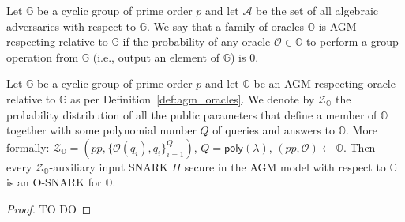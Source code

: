 \begin{definition}
\label{def:agm_oracles}
Let $\mathbb{G}$ be a cyclic group of prime order $p$ and let $\mathcal{A}$ be the set of all algebraic adversaries with 
respect to $\mathbb{G}$. We say that a family of oracles $\mathbb{O}$ is AGM respecting relative to $\mathbb{G}$ if 
the probability of any oracle $\mathcal{O} \in \mathbb{O}$ to perform a group operation from $\mathbb{G}$ 
(i.e., output an element of $\mathbb{G}$) is $0$. 
\end{definition}

\begin{theorem}
\label{the:when_osnarks} 
Let $\mathbb{G}$ be a cyclic group of prime order $p$ and let $\mathbb{O}$ be an AGM respecting oracle 
relative to $\mathbb{G}$ as per Definition~\ref{def:agm_oracles}. We denote by $\mathcal{Z}_{\mathbb{O}}$ the 
probability distribution of all the public parameters that define a member of $\mathbb{O}$ together with some 
polynomial number $Q$ of queries and answers to $\mathbb{O}$. More formally: 
$\mathcal{Z}_{\mathbb{O}} = (\mathit{pp}, \{\mathcal{O}(q_i), q_i\}_{i=1}^Q)$, $Q = \mathsf{poly}(\lambda)$, $(\mathit{pp}, \mathcal{O}) \leftarrow \mathbb{O}$. 
Then every $\mathcal{Z}_{\mathbb{O}}$-auxiliary input SNARK $\Pi$ secure in the AGM model with respect to $\mathbb{G}$ is an O-SNARK for $\mathbb{O}$.
\end{theorem}

\begin{proof}{\color{red} TO DO}
\end{proof}


